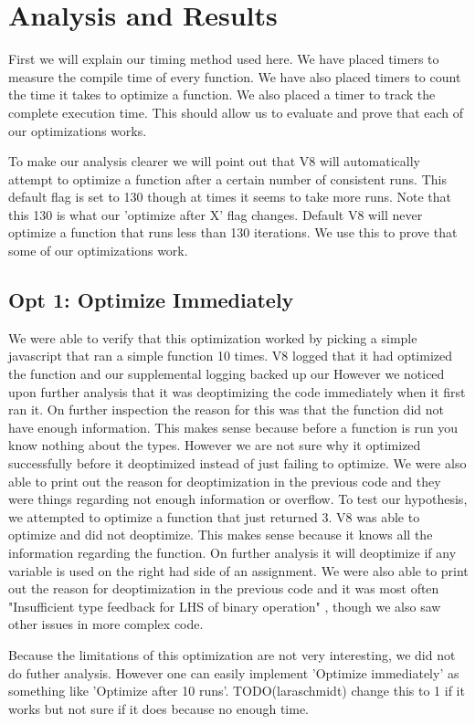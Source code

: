 \documentclass[twocolumn,showpacs,%
  nofootinbib,aps,superscriptaddress,%
  eqsecnum,prd,notitlepage,showkeys,10pt]{revtex4-1}
\begin{document}
\section{Analysis and Results}
First we will explain our timing method used here. We have placed timers to measure the compile time of every function. We have also placed timers to count the time it takes to optimize a function. We also placed a timer to track the complete execution time. This should allow us to evaluate and prove that each of our optimizations works. 

To make our analysis clearer we will point out that V8 will automatically attempt to optimize a function after a certain number of consistent runs. This default flag is set to 130 though at times it seems to take more runs. Note that this 130 is what our 'optimize after X' flag changes. Default V8 will never optimize a function that runs less than 130 iterations. We use this to prove that some of our optimizations work.

\subsection{Opt 1: Optimize Immediately}
We were able to verify that this optimization worked by picking a simple javascript that ran a simple function 10 times. V8 logged that it had optimized the function and our supplemental logging backed up our  However we noticed upon further analysis that it was deoptimizing the code immediately when it first ran it. On further inspection the reason for this was that the function did not have enough information. This makes sense because before a function is run you know nothing about the types. However we are not sure why it optimized successfully before it deoptimized instead of just failing to optimize. We were also able to print out the reason for deoptimization in the previous code and they were things regarding not enough information or overflow. To test our hypothesis, we attempted to optimize a function that just returned 3. V8 was able to optimize and did not deoptimize. This makes sense because it knows all the information regarding the function. On further analysis it will deoptimize if any variable is used on the right had side of an assignment. We were also able to print out the reason for deoptimization in the previous code and it was most often "Insufficient type feedback for LHS of binary operation" , though we also saw other issues in more complex code.

Because the limitations of this optimization are not very interesting, we did not do futher analysis. However one can easily implement 'Optimize immediately' as something like 'Optimize after 10 runs'. TODO(laraschmidt) change this to 1 if it works but not sure if it does because no enough time.
\end{document}
